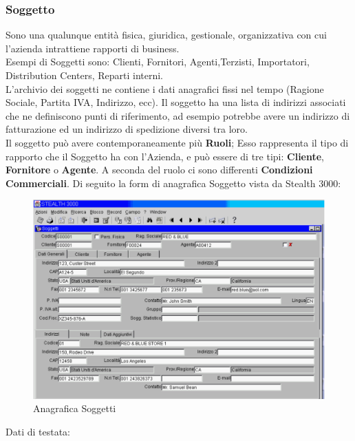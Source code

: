 \subsubsection{Soggetto}
Sono una qualunque entità fisica, giuridica, gestionale, organizzativa con cui l'azienda intrattiene rapporti di business.\\
Esempi di Soggetti sono: Clienti, Fornitori, Agenti,Terzisti, Importatori, Distribution Centers, Reparti interni.\\
L'archivio dei soggetti ne contiene i dati anagrafici fissi nel tempo (Ragione Sociale, Partita IVA, Indirizzo, ecc). Il soggetto ha una lista di indirizzi associati che ne definiscono punti di riferimento, ad esempio potrebbe avere un indirizzo di fatturazione ed un indirizzo di spedizione diversi tra loro.\\
Il soggetto può avere contemporaneamente più \textbf{Ruoli}; Esso rappresenta il tipo di rapporto che il Soggetto ha con l'Azienda, e può essere di tre tipi: \textbf{Cliente}, \textbf{Fornitore} o \textbf{Agente}. A seconda del ruolo ci sono differenti \textbf{Condizioni Commerciali}.
Di seguito la form di anagrafica Soggetto vista da Stealth 3000:
\newpage
\begin{figure}[!h]
\thispagestyle{empty}
\centering
\includegraphics[scale=0.45]{img/SogAnag.png}
\caption{Anagrafica Soggetti}
\end{figure}
\newpage
Dati di testata:
